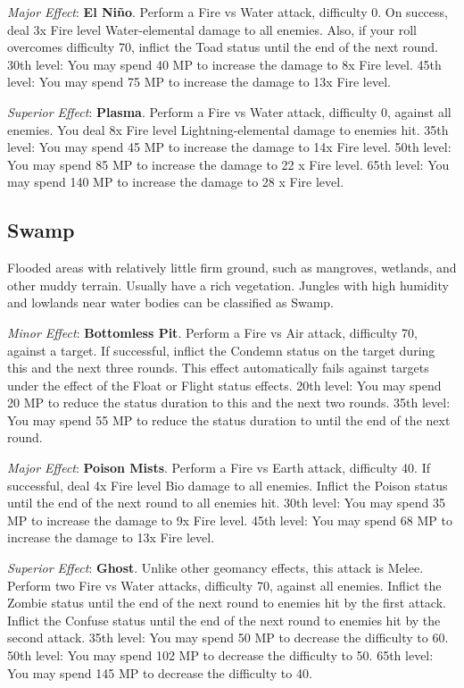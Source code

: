 \begin{multicols}{2}
\textit{Major Effect}: \textbf{El Niño}. Perform a Fire vs Water attack, difficulty 0. On success, deal 3x Fire level Water-elemental damage to all enemies. Also, if your roll overcomes difficulty 70, inflict the Toad status until the end of the next round. 30th level: You may spend 40 MP to increase the damage to 8x Fire level. 45th level: You may spend 75 MP to increase the damage to 13x Fire level.

\textit{Superior Effect}: \textbf{Plasma}. Perform a Fire vs Water attack, difficulty 0, against all enemies. You deal 8x Fire level Lightning-elemental damage to enemies hit. 35th level: You may spend 45 MP to increase the damage to 14x Fire level. 50th level: You may spend 85 MP to increase the damage to 22 x Fire level. 65th level: You may spend 140 MP to increase the damage to 28 x Fire level.

\subsection*{Swamp}\label{subsec:geo-swamp}
Flooded areas with relatively little firm ground, such as mangroves, wetlands, and other muddy terrain. Usually have a rich vegetation. Jungles with high humidity and lowlands near water bodies can be classified as Swamp.

\textit{Minor Effect}: \textbf{Bottomless Pit}. Perform a Fire vs Air attack, difficulty 70, against a target. If successful, inflict the Condemn status on the target during this and the next three rounds. This effect automatically fails against targets under the effect of the Float or Flight status effects. 20th level: You may spend 20 MP to reduce the status duration to this and the next two rounds. 35th level: You may spend 55 MP to reduce the status duration to until the end of the next round.

\textit{Major Effect}: \textbf{Poison Mists}. Perform a Fire vs Earth attack, difficulty 40. If successful, deal 4x Fire level Bio damage to all enemies. Inflict the Poison status until the end of the next round to all enemies hit. 30th level: You may spend 35 MP to increase the damage to 9x Fire level. 45th level: You may spend 68 MP to increase the damage to 13x Fire level.

\textit{Superior Effect}: \textbf{Ghost}. Unlike other geomancy effects, this attack is Melee. Perform two Fire vs Water attacks, difficulty 70, against all enemies. Inflict the Zombie status until the end of the next round to enemies hit by the first attack. Inflict the Confuse status until the end of the next round to enemies hit by the second attack. 35th level: You may spend 50 MP to decrease the difficulty to 60. 50th level: You may spend 102 MP to decrease the difficulty to 50. 65th level: You may spend 145 MP to decrease the difficulty to 40.


\end{multicols}
